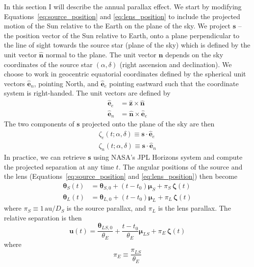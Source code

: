 \documentclass[12pt]{report}
\begin{document}
In this section I will describe the annual parallax effect. We start by
modifying Equations~\ref{eq:source_position} and \ref{eq:lens_position} to
include the projected motion of the Sun relative to the Earth on the plane of
the sky. We project $\mathbf s$ -- the position vector of the Sun relative to
Earth, onto a plane perpendicular to the line of sight towards the source star
(plane of the sky) which is defined by the unit vector $\boldsymbol{\hat n}$
normal to the plane. The unit vector $\boldsymbol{\hat n}$ depends on the sky
coordinates of the source star $(\alpha,\delta)$ (right ascension and
declination). We choose to work in geocentric equatorial coordinates defined by
the spherical unit vectors $\hat{\mathbf e}_n$, pointing North, and
$\hat{\mathbf e}_e$ pointing eastward such that the coordinate system is
right-handed. The unit vectors are defined by
\begin{align}
    \hat{\mathbf e}_e & = \hat{\mathbf z}\times \hat{\mathbf n}  \\
    \hat{\mathbf e}_n & = \hat{\mathbf n}\times\hat{\mathbf e}_e
\end{align}
The two components of $\mathbf s$ projected onto the plane of the sky are then
\begin{align}
    \zeta_e(t;\alpha,\delta)\equiv \mathbf s\cdot \hat{\mathbf e}_e \\
    \zeta_n(t;\alpha,\delta)\equiv \mathbf s\cdot \hat{\mathbf e}_n
\end{align}
In practice, we can retrieve $\mathbf{s}$ using NASA's JPL Horizons system and compute
the projected separation at any time $t$.
The angular positions of the source and the lens
(Equations~\ref{eq:source_position} and \ref{eq:lens_position}) then become
\begin{align}
    \boldsymbol{\theta}_S(t) & = \boldsymbol{\theta}_{S,0}+(t-t_0)\boldsymbol{\mu}_S
    +\pi_S\,\boldsymbol{\zeta}(t)                                                    \\
    \boldsymbol{\theta}_L(t) & = \boldsymbol{\theta}_{L,0}+(t-t_0)\boldsymbol{\mu}_L
    +\pi_L\,\boldsymbol{\zeta}(t)
\end{align}
where  $\pi_S\equiv 1\,\mathrm{au}/D_S$ is the source parallax, and $\pi_L$ is the
lens parallax.
The relative separation is then
\begin{equation}
    \boldsymbol{u}(t)= \frac{\boldsymbol\theta_{LS, 0}}{\theta_E}
    +\frac{t-t_0}{\theta_E}\boldsymbol{\mu}_{LS}+\pi_{E}\,\boldsymbol{\zeta}(t)
    \label{eq:relative_separation_parallax}
\end{equation}
where
\begin{equation}
    \pi_E\equiv \frac{\pi_{LS}}{\theta_E}
    \label{eq:pi_E}
\end{equation}
\end{document}
